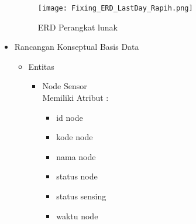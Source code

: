 \begin{itemize}

    \begin{figure}[H]
    	\centering  
    	\texttt{[image: Fixing\_ERD\_LastDay\_Rapih.png]}   
    	\caption[ERD Perangkat lunak]{ERD Perangkat lunak} 
    	\label{fig:ERD Perangkat lunak} 
    \end{figure}
    
    \item Rancangan Konseptual Basis Data
        \begin{itemize}
            \item Entitas
            \begin{itemize}
         
         
     \end{itemize}
    
     
    \begin{itemize}
         \item Node Sensor\\
         Memiliki Atribut :
         \begin{itemize}
             \item id node
             \item kode node
             \item nama node
             \item status node
             \item status sensing
             \item waktu node
         \end{itemize}
         

\end{itemize}
\end{itemize}
\end{itemize}
